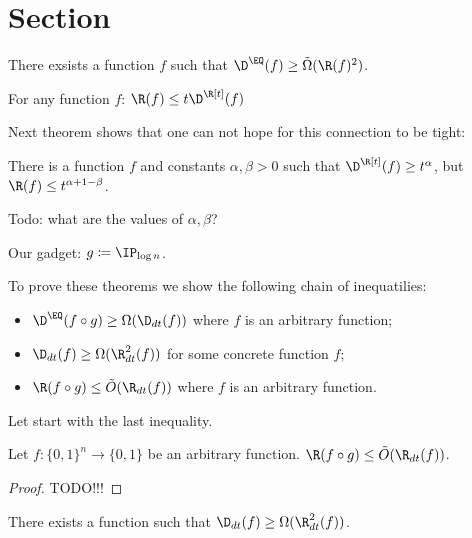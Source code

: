 \section{Section}

\begin{theorem}
    \label{th:eq_oracle}
    There exsists a function $f$ such that $\D^{\EQ}(f) \ge \tilde{\Omega}(\R(f)^2)$.
\end{theorem}


\begin{proposition}
  For any function $f$: $\R(f) \le t \D^{\R[t]}(f)$
\end{proposition}

Next theorem shows that one can not hope for this connection to be tight:

\begin{theorem}
    There is a function $f$ and constants $\alpha,\beta>0$ such that $\D^{\R[t]}(f) \ge t^{\alpha}$, but $\R(f) \le t^{\alpha + 1 - \beta}$.
    
    Todo: what are the values of $\alpha,\beta$?
\end{theorem}

Our gadget: $g \coloneqq \IP_{\log n}$.

To prove these theorems we show the following chain of inequatilies:
\begin{itemize}
    \item $\D^{\EQ}(f \circ g) \ge \Omega(\D_{dt}(f))$ where $f$ is an arbitrary function;
    \item $\D_{dt}(f) \ge \Omega(\R_{dt}^2(f))$ for some concrete function $f$;
    \item $\R(f \circ g) \le \tilde{O}(\R_{dt}(f))$ where $f$ is an arbitrary function.
\end{itemize}



Let start with the last inequality.

\begin{lemma}
    \label{lm:random_dt}
    Let $f:\{0, 1\}^n \to \{0, 1\}$ be an arbitrary function. $\R(f \circ g) \le \tilde{O}(\R_{dt}(f))$.
\end{lemma}

\begin{proof}
    TODO!!!
\end{proof}

\begin{lemma}[\ref{!!!}]
    \label{lm:dt_rt_sep}
    There exists a function such that $\D_{dt}(f) \ge \Omega(\R_{dt}^2(f))$.
\end{lemma}


